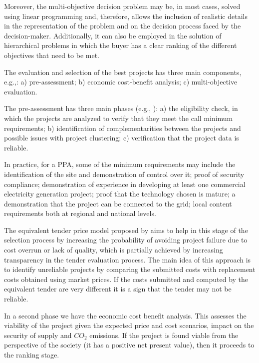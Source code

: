 \documentclass[informs]{informs3}
\begin{document}
Moreover, the multi-objective decision problem may be, in most cases, solved using linear programming and, therefore, allows the inclusion of realistic details in the representation of the problem and on the decision process faced by the decision-maker. Additionally, it can also be employed in the solution of hierarchical problems in which the buyer has a clear ranking of the different objectives that need to be met. 

The evaluation and selection of the best projects has three main components, e.g.,\cite{KEMA_et_al_2013}: a) pre-assessment; b) economic cost-benefit analysis; c) multi-objective evaluation.

The pre-assessment has three main phases (e.g., \citealp{Asian_Dev_Bank_2010}): a) the eligibility check, in which the projects are analyzed to verify that they meet the call minimum requirements; b) identification of complementarities between the projects and possible issues with project clustering; c) verification that the project data is reliable. 

In practice, for a PPA, some of the minimum requirements may include the identification of the site and demonstration of control over it; proof of security compliance; demonstration of experience in developing at least one commercial electricity generation project; proof that the technology chosen is mature; a demonstration that the project can be connected to the grid; local content requirements both at regional and national levels.


The equivalent tender price model proposed by \cite{Meland_et_al_2011} aims to help in this stage of the selection process by increasing the probability of avoiding project failure due to cost overrun or lack of quality, which is partially achieved by increasing transparency in the tender evaluation process. The main idea of this approach is to identify unreliable projects by comparing the submitted costs with replacement costs obtained using market prices. If the costs submitted and computed by the equivalent tender are very different it is a sign that the tender may not be reliable.


In a second phase we have the economic cost benefit analysis. This assesses the viability of the project given the expected price and cost scenarios, impact on the security of supply and $CO_2$ emissions. If the project is found viable from the perspective of the society (it has a positive net present value), then it proceeds to the ranking stage.
\end{document}
